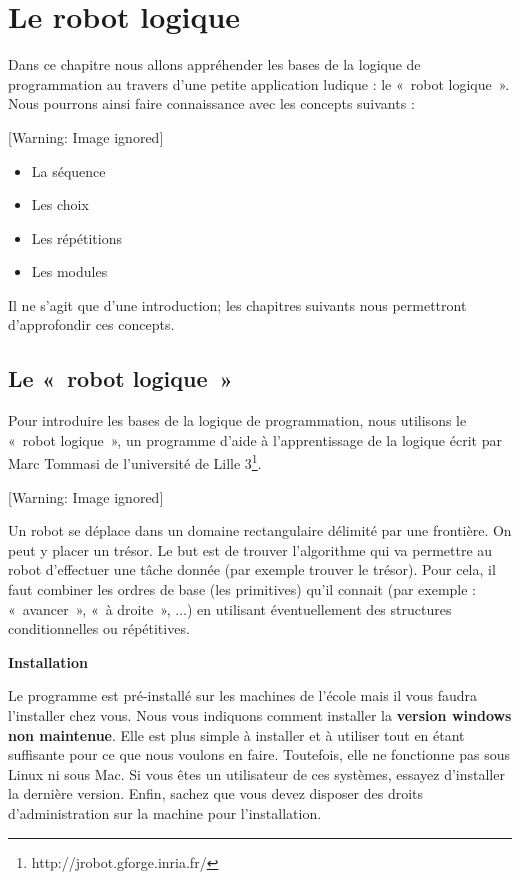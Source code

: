 \chapter{Le robot logique}
{
Dans ce chapitre nous allons appréhender les bases de la logique de
programmation au travers d'une petite application
ludique : le «~robot logique~». Nous pourrons ainsi faire connaissance
avec les concepts suivants :}

\begin{center}
 [Warning: Image ignored] %

\end{center}
\liststyleListv
\begin{itemize}
\item {
La séquence}
\item {
Les choix}
\item {
Les répétitions}
\item {
Les modules}
\end{itemize}
{
Il ne s'agit que d'une introduction;
les chapitres suivants nous permettront d'approfondir
ces concepts.}

\section{Le «~robot logique~»}
{
Pour introduire les bases de la logique de programmation, nous utilisons
le «~robot logique~», un programme d'aide à
l'apprentissage de la logique écrit par Marc Tommasi
de l'université de Lille
3\footnote{http://jrobot.gforge.inria.fr/}.}

\begin{center}
 [Warning: Image ignored] %

\end{center}
{
Un robot se déplace dans un domaine rectangulaire délimité par une
frontière. On peut y placer un trésor. Le but est de trouver
l'algorithme qui va permettre au robot
d'effectuer une tâche donnée (par exemple trouver le
trésor). Pour cela, il faut combiner les ordres de base (les
primitives) qu'il connait (par exemple : «~avancer~»,
«~à droite~», ...) en utilisant éventuellement des structures
conditionnelles ou répétitives.}

{\sffamily\bfseries\upshape
Installation}

{
Le programme est pré-installé sur les machines de
l'école mais il vous faudra
l'installer chez vous. Nous vous indiquons comment
installer la \textbf{version windows non maintenue}. Elle est plus
simple à installer et à utiliser tout en étant suffisante pour ce que
nous voulons en faire. Toutefois, elle ne fonctionne pas sous Linux ni
sous Mac. Si vous êtes un utilisateur de ces systèmes, essayez
d'installer la dernière version. Enfin, sachez que
vous devez disposer des droits d'administration sur la
machine pour l'installation.}

